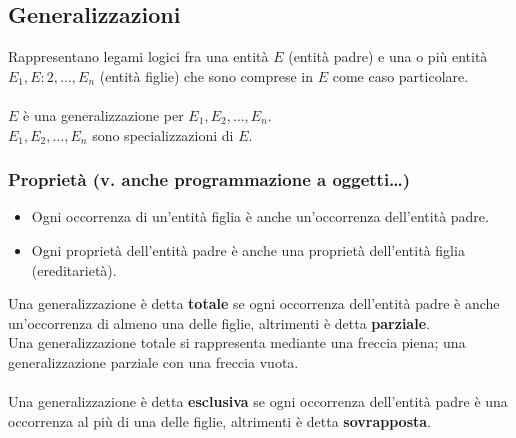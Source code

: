 \documentclass[../main.tex]{subfiles}
\begin{document}
	\subsection{Generalizzazioni}
	Rappresentano legami logici fra una entità $E$ (entità padre) e una o più entità $E_1, E:2, \dots, E_n$ (entità figlie) che sono comprese in $E$ come caso particolare.\\\\
	$E$ è una generalizzazione per $E_1, E_2, \dots , E_n$.\\
	$E_1, E_2, \dots , E_n$ sono specializzazioni di $E$.
	\subsubsection{Proprietà (v. anche programmazione a oggetti…)}
	\begin{itemize}
		\item Ogni occorrenza di un’entità figlia è anche un’occorrenza dell’entità padre.
		\item Ogni proprietà dell’entità padre è anche una proprietà dell’entità figlia (ereditarietà).
	\end{itemize}
	Una generalizzazione è detta \textbf{totale} se ogni occorrenza dell’entità padre è anche un’occorrenza di almeno una delle figlie, altrimenti è detta \textbf{parziale}.\\
	Una generalizzazione totale si rappresenta mediante una freccia piena; una generalizzazione parziale con una freccia vuota.\\\\
	Una generalizzazione è detta \textbf{esclusiva} se ogni occorrenza dell’entità padre è una occorrenza al più di una delle figlie, altrimenti è detta \textbf{sovrapposta}.
\end{document}
